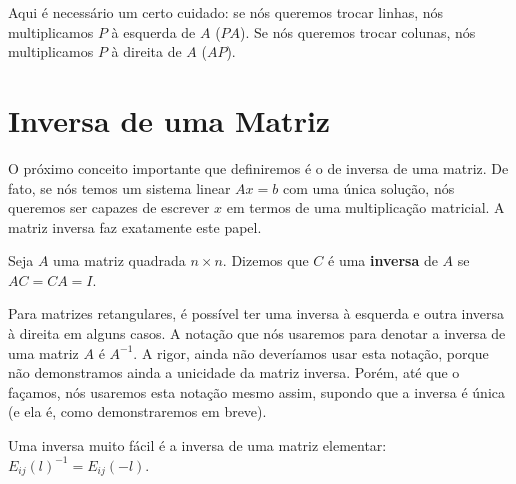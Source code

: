 Aqui é necessário um certo cuidado: se nós queremos trocar linhas, nós multiplicamos $P$ à esquerda de $A$ ($PA$). Se nós queremos trocar colunas, nós multiplicamos $P$ à direita de $A$ ($AP$).

\section{Inversa de uma Matriz}

O próximo conceito importante que definiremos é o de inversa de uma matriz. De fato, se nós temos um sistema linear $Ax = b$ com uma única solução, nós queremos ser capazes de escrever $x$ em termos de uma multiplicação matricial. A matriz inversa faz exatamente este papel.

\begin{Definition}
	Seja $A$ uma matriz quadrada $n\times n$. Dizemos que $C$ é uma \textbf{inversa} de $A$ se $AC = CA = I$. 
\end{Definition}

Para matrizes retangulares, é possível ter uma inversa à esquerda e outra inversa à direita em alguns casos. A notação que nós usaremos para denotar a inversa de uma matriz $A$ é $A^{-1}$. A rigor, ainda não deveríamos usar esta notação, porque não demonstramos ainda a unicidade da matriz inversa. Porém, até que o façamos, nós usaremos esta notação mesmo assim, supondo que a inversa é única (e ela é, como demonstraremos em breve).

Uma inversa muito fácil é a inversa de uma matriz elementar: $E_{ij}(l)^{-1} = E_{ij}(-l)$.

